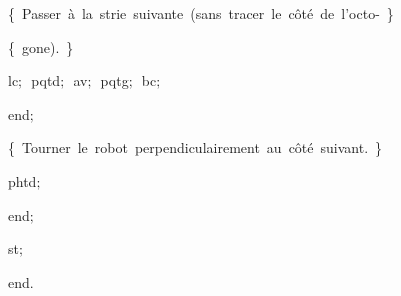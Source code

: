{\vspace{\neglskip}\mbox{\blc  \blk\blk\blk\blk\blk\idt  \cmt  \{\ Passer\ à\ la\ strie\ suivante\ (sans\ tracer\ le\ côté\ de\ l{'}octo-\ \}\idt }\par 
\vspace{\neglskip}\mbox{\blc  \blk\blk\blk\blk\blk\idt  \cmt  \{\ gone).\ \}\idt }\par 
\vspace{\neglskip}\mbox{\blc  \blk\blk\blk\blk\blk\idt  lc$;$\ pqtd$;$\ av$;$\ pqtg$;$\ bc$;$\ }\par 
\vspace{\neglskip}\mbox{\blc  \blk\blk\blk\blk\idt  \mcl end\idt $;$}\par 
\vspace{\neglskip}\mbox{\blc  \blk\blk\blk\idt  \cmt  \{\ Tourner\ le\ robot\ perpendiculairement\ au\ côté\ suivant.\ \}\idt \ }\par 
\vspace{\neglskip}\mbox{\blc  \blk\blk\blk\idt  phtd$;$\ }\par 
\vspace{\neglskip}\mbox{\blc  \blk\blk\idt  \mcl end\idt $;$}\par 
\vspace{\neglskip}\mbox{\blc  \blk\idt  st$;$}\par 
\vspace{\neglskip}\mbox{\blc  \idt  \mcl end\idt $.$}\par 

\medskip }

